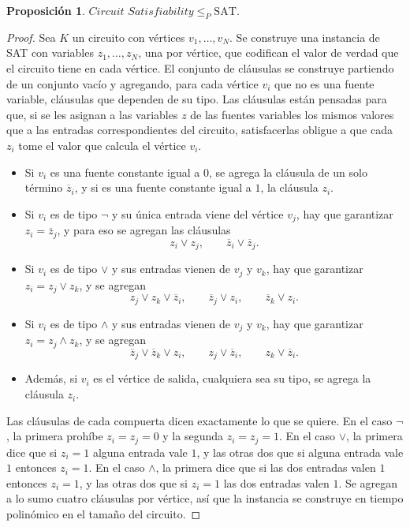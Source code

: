 \documentclass[12pt, spanish, oneside, openany]{book}
\newcommand{\redp}{\le_{P}}
\newcommand{\prob}[1]{\textit{#1}}
\newcommand{\CSAT}{\prob{Circuit Satisfiability}\xspace}
\newcommand{\nega}[1]{\overline{#1}} %
\theoremstyle{uprightplain}
\newtheorem{proposicion}[teorema]{Proposición}
\theoremstyle{definition}
\theoremstyle{remark}
\theoremstyle{definition}
\begin{document}
\begin{proposicion}
\label{prop:np-csat-sat}
$\CSAT\redp\mathrm{SAT}$.
\end{proposicion}
\begin{proof}
Sea $K$ un circuito con vértices $v_1,\dots,v_N$. Se construye una instancia de SAT con variables $z_1,\dots,z_N$, una por vértice, que codifican el valor de verdad que el circuito tiene en cada vértice. El conjunto de cláusulas se construye partiendo de un conjunto vacío y agregando, para cada vértice $v_i$ que no es una fuente variable, cláusulas que dependen de su tipo. Las cláusulas están pensadas para que, si se les asignan a las variables $z$ de las fuentes variables los mismos valores que a las entradas correspondientes del circuito, satisfacerlas obligue a que cada $z_i$ tome el valor que calcula el vértice $v_i$.
\begin{itemize}
    \item Si $v_i$ es una fuente constante igual a $0$, se agrega la cláusula de un solo término $\nega{z}_i$, y si es una fuente constante igual a $1$, la cláusula $z_i$.
    \item Si $v_i$ es de tipo $\neg$ y su única entrada viene del vértice $v_j$, hay que garantizar $z_i=\nega{z}_j$, y para eso se agregan las cláusulas
    \[
    z_i\vee z_j,\qquad \nega{z}_i\vee\nega{z}_j .
    \]
    \item Si $v_i$ es de tipo $\vee$ y sus entradas vienen de $v_j$ y $v_k$, hay que garantizar $z_i=z_j\vee z_k$, y se agregan
    \[
    z_j\vee z_k\vee\nega{z}_i,\qquad \nega{z}_j\vee z_i,\qquad \nega{z}_k\vee z_i .
    \]
    \item Si $v_i$ es de tipo $\wedge$ y sus entradas vienen de $v_j$ y $v_k$, hay que garantizar $z_i=z_j\wedge z_k$, y se agregan
    \[
    \nega{z}_j\vee\nega{z}_k\vee z_i,\qquad z_j\vee\nega{z}_i,\qquad z_k\vee\nega{z}_i .
    \]
    \item Además, si $v_i$ es el vértice de salida, cualquiera sea su tipo, se agrega la cláusula $z_i$.
\end{itemize}
Las cláusulas de cada compuerta dicen exactamente lo que se quiere. En el caso $\neg$, la primera prohíbe $z_i=z_j=0$ y la segunda $z_i=z_j=1$. En el caso $\vee$, la primera dice que si $z_i=1$ alguna entrada vale $1$, y las otras dos que si alguna entrada vale $1$ entonces $z_i=1$. En el caso $\wedge$, la primera dice que si las dos entradas valen $1$ entonces $z_i=1$, y las otras dos que si $z_i=1$ las dos entradas valen $1$. Se agregan a lo sumo cuatro cláusulas por vértice, así que la instancia se construye en tiempo polinómico en el tamaño del circuito.


\end{proof}
\end{document}
